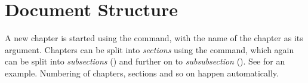 {\section{Document Structure}
\index{\latexin{\chapter}}
\index{\latexin{\section}}
\index{\latexin{\subsection}}
\index{\latexin{\subsubsection}}
A new chapter is started using the \latexin{\chapter} command, with the name of the chapter as its argument. Chapters can be split into \emph{sections} using the \latexin{\section} command, which again can be split into \emph{subsections} (\latexin{\subsection}) and further on to \emph{subsubsection} (\latexin{\subsubsection}). See  for an example. Numbering of chapters, sections and so on happen automatically.


}

